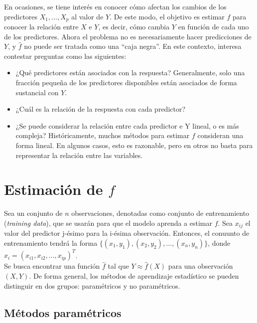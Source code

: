 En ocasiones, se tiene interés en conocer cómo afectan los cambios de los predictores $X_1, \dots, X_p$ al valor de $Y$. De este modo, el objetivo es estimar $f$ para conocer la relación entre $X$ e $Y$, es decir, cómo cambia $Y$ en función de cada uno de los predictores. Ahora el problema no es necesariamente hacer predicciones de $Y$, y $\hat{f}$ no puede ser tratada como una ``caja negra''. En este contexto, interesa contestar preguntas como las siguientes:
\begin{itemize}
\item ¿Qué predictores están asociados con la respuesta? Generalmente, solo una fracción pequeña de los predictores disponibles están asociados de forma sustancial con $Y$.
\item ¿Cuál es la relación de la respuesta con cada predictor?
\item ¿Se puede considerar la relación entre cada predictor e Y lineal, o es más compleja? Históricamente, muchos métodos para estimar $f$ consideran una forma lineal. En algunos casos, esto es razonable, pero en otros no basta para representar la relación entre las variables.
\end{itemize}

\section{Estimación de $f$}

Sea un conjunto de $n$ observaciones, denotadas como conjunto de entrenamiento (\textit{training data}), que se usarán para que el modelo aprenda a estimar $f$. Sea $x_{ij}$ el valor del predictor j-ésimo para la i-ésima observación. Entonces, el conuunto de entrenamiento tendrá la forma $\{(x_1, y_1), (x_2, y_2), \dots, (x_n, y_n)\}$, donde $x_i = (x_{i1}, x_{i2}, \dots, x_{ip})^T$. \\

Se busca encontrar una función $\hat{f}$ tal que $Y \approx \hat{f} (X)$ para una observación $(X, Y)$. De forma general, los métodos de aprendizaje estadístico se pueden distinguir en dos grupos: paramétricos y no paramétricos.

\subsection{Métodos paramétricos}

